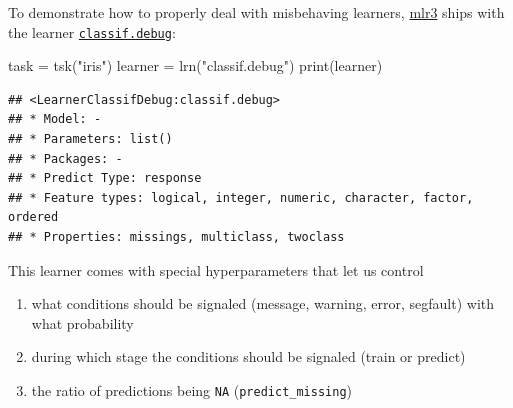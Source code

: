 \documentclass[
]{scrbook}
\newenvironment{Shaded}{\begin{snugshade}}{\end{snugshade}}
\newcommand{\FunctionTok}[1]{\textcolor[rgb]{0.00,0.00,0.00}{#1}}
\newcommand{\NormalTok}[1]{#1}
\newcommand{\OtherTok}[1]{\textcolor[rgb]{0.56,0.35,0.01}{#1}}
\newcommand{\SpecialCharTok}[1]{\textcolor[rgb]{0.00,0.00,0.00}{#1}}
\newcommand{\StringTok}[1]{\textcolor[rgb]{0.31,0.60,0.02}{#1}}
\providecommand{\tightlist}{%
  \setlength{\itemsep}{0pt}\setlength{\parskip}{0pt}}
\renewenvironment{Shaded} {\begin{snugshade}\small} {\end{snugshade}}
\begin{document}
To demonstrate how to properly deal with misbehaving learners, \href{https://mlr3.mlr-org.com}{mlr3} ships with the learner \href{https://mlr3.mlr-org.com/reference/mlr_learners_classif.debug.html}{\texttt{classif.debug}}:

\begin{Shaded}
\begin{Highlighting}[]
\NormalTok{task }\OtherTok{=} \FunctionTok{tsk}\NormalTok{(}\StringTok{"iris"}\NormalTok{)}
\NormalTok{learner }\OtherTok{=} \FunctionTok{lrn}\NormalTok{(}\StringTok{"classif.debug"}\NormalTok{)}
\FunctionTok{print}\NormalTok{(learner)}
\end{Highlighting}
\end{Shaded}

\begin{verbatim}
## <LearnerClassifDebug:classif.debug>
## * Model: -
## * Parameters: list()
## * Packages: -
## * Predict Type: response
## * Feature types: logical, integer, numeric, character, factor, ordered
## * Properties: missings, multiclass, twoclass
\end{verbatim}

This learner comes with special hyperparameters that let us control

\begin{enumerate}
\def\labelenumi{\arabic{enumi}.}
\tightlist
\item
  what conditions should be signaled (message, warning, error, segfault) with what probability
\item
  during which stage the conditions should be signaled (train or predict)
\item
  the ratio of predictions being \texttt{NA} (\texttt{predict\_missing})
\end{enumerate}

\begin{Shaded}
\end{Shaded}
\end{document}
